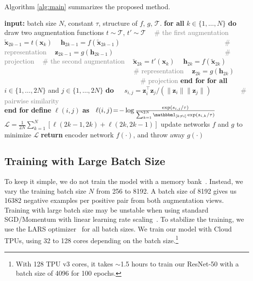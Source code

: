 \documentclass{article}
\begin{document}
Algorithm \ref{alg:main} summarizes the proposed method.

\begin{algorithm}[!t]
\caption{\label{alg:main} SimCLR's main learning algorithm.}
\begin{algorithmic}
    \STATE \textbf{input:} batch size $N$, constant $\tau$, structure of $f$, $g$, $\mathcal{T}$.
    \STATE \textbf{for all} $k\in \{1, \ldots, N\}$ \textbf{do}
        \STATE $~~~~$draw two augmentation functions $t \!\sim\! \mathcal{T}$, $t' \!\sim\! \mathcal{T}$
        \STATE $~~~~$\textcolor{gray}{\# the first augmentation} \STATE $~~~~$$\tilde{\bm x}_{2k-1} = t(\bm x_k)$
        \STATE $~~~~$$\bm h_{2k-1} = f(\tilde{\bm x}_{2k-1})$  \textcolor{gray}{~~~~~~~~~~~~~~~~~~~~~~~~~~~~~~\# representation}
        \STATE $~~~~$$\bm z_{2k-1} = g({\bm h}_{2k-1})$  \textcolor{gray}{~~~~~~~~~~~~~~~~~~~~~~~~~~~~~~~~\# projection}
        \STATE $~~~~$\textcolor{gray}{\# the second augmentation} \STATE $~~~~$$\tilde{\bm x}_{2k} = t'(\bm x_k)$
        \STATE $~~~~$$\bm h_{2k} = f(\tilde{\bm x}_{2k})$      \textcolor{gray}{~~~~~~~~~~~~~~~~~~~~~~~~~~~~~~~~~~~~~~\# representation}
        \STATE $~~~~$$\bm z_{2k} = g({\bm h}_{2k})$      \textcolor{gray}{~~~~~~~~~~~~~~~~~~~~~~~~~~~~~~~~~~~~~~~~\# projection}
    \STATE \textbf{end for}
    \STATE \textbf{for all} $i\in\{1, \ldots, 2N\}$ and $j\in\{1, \dots, 2N\}$ \textbf{do}
    \STATE $~~~~$ $s_{i,j} = \bm z_i^\top \bm z_j / (\lVert\bm z_i\rVert \lVert\bm z_j\rVert)$ \textcolor{gray}{~~~~~~~~\# pairwise similarity}\\
    \STATE \textbf{end for}
    \STATE \textbf{define} $\ell(i, j)$ \textbf{as}~ $\ell(i, j) \!=\! -\log \frac{\exp(s_{i,j}/\tau)}{\sum_{k=1}^{2N} \one{k \neq i}\exp(s_{i, k}/\tau)}$ \\ \STATE $\mathcal{L} = \frac{1}{2N} \sum_{k=1}^N \left[ \ell(2k\!-\!1, 2k) + \ell(2k, 2k\!-\!1)\right]$
    \STATE update networks $f$ and $g$ to minimize $\mathcal{L}$
    \ENDFOR
    \STATE \textbf{return} encoder network $f(\cdot)$, and throw away $g(\cdot)$
\end{algorithmic}
\end{algorithm}

\subsection{Training with Large Batch Size}
To keep it simple, we do not train the model with a memory bank~\cite{wu2018unsupervised,he2019momentum}. Instead, we vary the training batch size $N$ from 256 to 8192. A batch size of 8192 gives us 16382 negative examples per positive pair from both augmentation views. Training with large batch size may be unstable when using standard SGD/Momentum with linear learning rate scaling~\cite{goyal2017accurate}. To stabilize the training, we use the LARS optimizer~\cite{you2017large} for all batch sizes.
We train our model with Cloud TPUs, using 32 to 128 cores depending on the batch size.\footnote{With 128 TPU v3 cores, it takes $\sim$1.5 hours to train our ResNet-50 with a batch size of 4096 for 100 epochs.}
\end{document}
